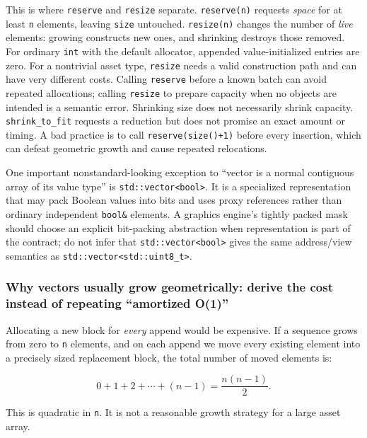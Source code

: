 This is where \texttt{reserve} and \texttt{resize} separate. \texttt{reserve(n)} requests \emph{space} for at least \texttt{n} elements, leaving \texttt{size} untouched. \texttt{resize(n)} changes the number of \emph{live} elements: growing constructs new ones, and shrinking destroys those removed. For ordinary \texttt{int} with the default allocator, appended value-initialized entries are zero. For a nontrivial asset type, \texttt{resize} needs a valid construction path and can have very different costs. Calling \texttt{reserve} before a known batch can avoid repeated allocations; calling \texttt{resize} to prepare capacity when no objects are intended is a semantic error. Shrinking size does not necessarily shrink capacity. \texttt{shrink\_to\_fit} requests a reduction but does not promise an exact amount or timing. A bad practice is to call \texttt{reserve(size()+1)} before every insertion, which can defeat geometric growth and cause repeated relocations.

One important nonstandard-looking exception to ``vector is a normal contiguous array of its value type'' is \texttt{std::vector\textless{}bool\textgreater{}}. It is a specialized representation that may pack Boolean values into bits and uses proxy references rather than ordinary independent \texttt{bool\&} elements. A graphics engine's tightly packed mask should choose an explicit bit-packing abstraction when representation is part of the contract; do not infer that \texttt{std::vector\textless{}bool\textgreater{}} gives the same address/view semantics as \texttt{std::vector\textless{}std::uint8\_t\textgreater{}}.

\subsubsection{Why vectors usually grow geometrically: derive the cost instead of repeating ``amortized O(1)''}\label{why-vectors-usually-grow-geometrically-derive-the-cost-instead-of-repeating-amortized-o1}

Allocating a new block for \emph{every} append would be expensive. If a sequence grows from zero to \texttt{n} elements, and on each append we move every existing element into a precisely sized replacement block, the total number of moved elements is:

\[
0+1+2+\cdots+(n-1)=\frac{n(n-1)}{2}.
\]

This is quadratic in \texttt{n}. It is not a reasonable growth strategy for a large asset array.

